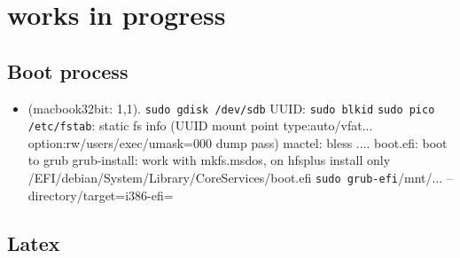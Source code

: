 \section{works in progress}

\subsection{Boot process}

\begin{itemize}
\item (macbook32bit: 1,1).
\verb=sudo gdisk /dev/sdb=
UUID: \verb=sudo blkid=
\verb=sudo pico /etc/fstab=: static fs info (UUID mount point 
type:auto/vfat... option:rw/users/exec/umask=000 dump pass)
mactel: bless .... boot.efi: boot to grub
grub-install: work with mkfs.msdos, on hfsplus install only /EFI/debian/System/Library/CoreServices/boot.efi
\verb=sudo grub-efi=/mnt/... --directory/target=i386-efi=

\end{itemize}

\subsection{Latex}

